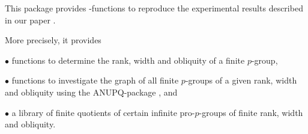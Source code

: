 

This package provides \GAP-functions to reproduce the experimental
results described in our paper \cite{ER09}.

More precisely, it provides
\beginlist
\item{$\bullet$} functions to determine the rank, width and obliquity
  of a finite $p$-group,
\item{$\bullet$} functions to investigate the graph of all finite $p$-groups of a
  given rank, width and obliquity using the ANUPQ-package \cite{ANU06}, and
\item{$\bullet$} a library of finite quotients of certain infinite pro-$p$-groups
  of finite rank, width and obliquity.
\endlist
